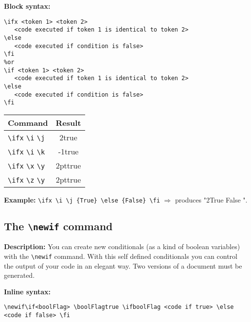 \documentclass[12pt]{article}
\renewcommand{\i}{1}
\renewcommand{\j}{2}
\renewcommand{\k}{-1}
\newcommand{\x}{1.1cm}
\newcommand{\y}{2pt}
\newcommand{\z}{2.0pt}
\newif\ifboolFlag \boolFlagtrue %
\begin{document}
		\noindent\textbf{Block syntax:}
		\begin{lstlisting}
\ifx <token 1> <token 2>
   <code executed if token 1 is identical to token 2>
\else
   <code executed if condition is false>
\fi 
%or
\if <token 1> <token 2>
   <code executed if token 1 is identical to token 2>
\else
   <code executed if condition is false>
\fi
		\end{lstlisting}

	\begin{center}
		\begin{tabular}{l|c}
			\hline
			\textbf{Command} & \textbf{Result} \\
			\hline
			\verb|\ifx| \texttt{\textbackslash i} \texttt{\textbackslash j} & 
			\ifx \i \j	{true}	\else	{false}  \fi \\
			\verb|\ifx| \texttt{\textbackslash i} \texttt{\textbackslash k} & 
			\ifx \i \k	{true}	\else	{false}  \fi \\
			\verb|\ifx| \texttt{\textbackslash x} \texttt{\textbackslash y} & 
			\ifx \x \y	{true}	\else	{false}  \fi \\
			\verb|\ifx| \texttt{\textbackslash z} \texttt{\textbackslash y} & 
			\ifx \z \y	{true}	\else	{false}  \fi \\
			\hline
		\end{tabular}
	\end{center}

	\noindent\textbf{Example:} \verb|\ifx \i \j {True} \else {False} \fi| $\Longrightarrow$ produces "\ifx \i \j True \else False \fi".


	\subsection{The \texttt{\textbackslash newif} command}
	\noindent\textbf{Description:} You can create new conditionals (as a kind of boolean variables) with the \verb|\newif| command. With this self defined conditionals you can control the output of your code in an elegant way. Two versions of a document must be generated.

	\noindent\textbf{Inline syntax:}
	\begin{lstlisting}
\newif\if<boolFlag> \boolFlagtrue \ifboolFlag <code if true> \else <code if false> \fi
	\end{lstlisting}
\end{document}
